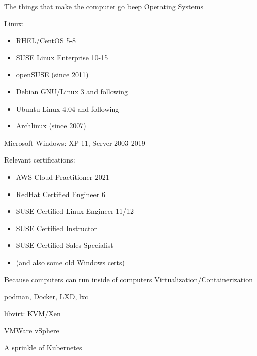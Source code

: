 

\begin{cventries}
  \cventry
    {The things that make the computer go beep}
    {Operating Systems}
		{}
    {}
    {
			\begin{cvitems}
				\item Linux:
          \begin{itemize}
            \item RHEL/CentOS 5-8
            \item SUSE Linux Enterprise 10-15
            \item openSUSE (since 2011)
            \item Debian GNU/Linux 3 and following
            \item Ubuntu Linux 4.04 and following
            \item Archlinux (since 2007)
          \end{itemize}
				\item Microsoft Windows: XP-11, Server 2003-2019
        \item Relevant certifications:
          \begin{itemize}
            \item AWS Cloud Practitioner 2021
            \item RedHat Certified Engineer 6
            \item SUSE Certified Linux Engineer 11/12
            \item SUSE Certified Instructor
            \item SUSE Certified Sales Specialist
            \item (and also some old Windows certs)
          \end{itemize}
      \end{cvitems}
    }
  \cventry
    {Because computers can run inside of computers}
    {Virtualization/Containerization}
    {}
    {}
    {
      \begin{cvitems}
        \item podman, Docker, LXD, lxc
        \item libvirt: KVM/Xen
        \item VMWare vSphere
        \item A sprinkle of Kubernetes
      \end{cvitems}
}
\end{cventries}
